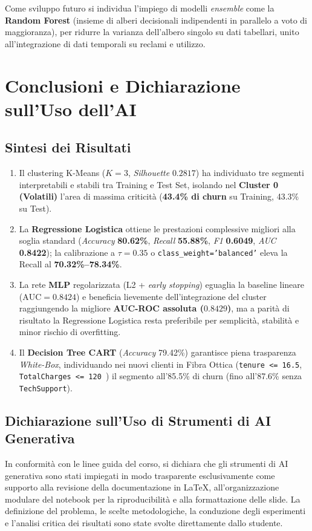 \documentclass[11pt,a4paper]{article}
\begin{document}
Come sviluppo futuro si individua l'impiego di modelli \textit{ensemble} come la \textbf{Random Forest} (insieme di alberi decisionali indipendenti in parallelo a voto di maggioranza), per ridurre la varianza dell'albero singolo su dati tabellari, unito all'integrazione di dati temporali su reclami e utilizzo.

\section{Conclusioni e Dichiarazione sull'Uso dell'AI}
\subsection{Sintesi dei Risultati}
\begin{enumerate}
    \item Il clustering K-Means ($K=3$, \textit{Silhouette} $0.2817$) ha individuato tre segmenti interpretabili e stabili tra Training e Test Set, isolando nel \textbf{Cluster 0 (Volatili)} l'area di massima criticità (\textbf{43.4\% di churn} su Training, 43.3\% su Test).
    \item La \textbf{Regressione Logistica} ottiene le prestazioni complessive migliori alla soglia standard (\textit{Accuracy} \textbf{80.62\%}, \textit{Recall} \textbf{55.88\%}, \textit{F1} \textbf{0.6049}, \textit{AUC} \textbf{0.8422}); la calibrazione a $\tau=0.35$ o \texttt{class\_weight='balanced'} eleva la Recall al \textbf{70.32\%--78.34\%}.
    \item La rete \textbf{MLP} regolarizzata (L2 + \textit{early stopping}) eguaglia la baseline lineare ($\text{AUC}=0.8424$) e beneficia lievemente dell'integrazione del cluster raggiungendo la migliore \textbf{AUC-ROC assoluta ($0.8429$)}, ma a parità di risultato la Regressione Logistica resta preferibile per semplicità, stabilità e minor rischio di overfitting.
    \item Il \textbf{Decision Tree CART} (\textit{Accuracy} 79.42\%) garantisce piena trasparenza \textit{White-Box}, individuando nei nuovi clienti in Fibra Ottica (\texttt{tenure <= 16.5}, \texttt{TotalCharges <= 120\,\texteuro}) il segmento all'85.5\% di churn (fino all'87.6\% senza \texttt{TechSupport}).
\end{enumerate}

\subsection{Dichiarazione sull'Uso di Strumenti di AI Generativa}
In conformità con le linee guida del corso, si dichiara che gli strumenti di AI generativa sono stati impiegati in modo trasparente esclusivamente come supporto alla revisione della documentazione in LaTeX, all'organizzazione modulare del notebook per la riproducibilità e alla formattazione delle slide. La definizione del problema, le scelte metodologiche, la conduzione degli esperimenti e l'analisi critica dei risultati sono state svolte direttamente dallo studente.
\end{document}
